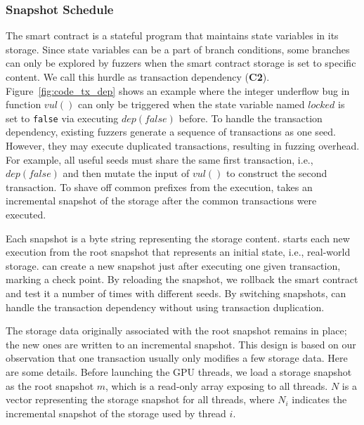 \subsubsection{Snapshot Schedule}
\label{design:snapshot}
The smart contract is a stateful program that maintains state variables in its storage. Since state variables can be a part of branch conditions, some branches can only be explored by fuzzers when the smart contract storage is set to specific content. 
We call this hurdle as transaction dependency (\textbf{C2}).
%
Figure~\ref{fig:code_tx_dep} shows an example where the integer underflow bug in function $vul()$ can only be triggered when the state variable named $locked$ is set to \texttt{false} via executing $dep(false)$ before. 
%
To handle the transaction dependency, existing fuzzers generate a sequence of transactions as one seed\cite{confuzzius_eurosp, echidna_issta, ilf_ccs}. 
%
%
However, they may execute duplicated transactions, resulting in fuzzing overhead. 
For example, all useful seeds must share the same first transaction, i.e., $dep(false)$ and then mutate the input of $vul()$ to construct the second transaction.
To shave off common prefixes from the execution, {\tool} takes an incremental snapshot of the storage after the common transactions were executed.
%
%

Each snapshot is a byte string representing the storage content. 
{\tool} starts each new execution from the root snapshot that represents an initial state, i.e., real-world storage.
{\tool} can create a new snapshot just after executing one given transaction, marking a check point. 
By reloading the snapshot, we rollback the smart contract and test it a number of times with different seeds.
%
%
By switching snapshots, {\tool} can handle the transaction dependency without using transaction duplication. 


%
The storage data originally associated with the root snapshot remains in place; the new ones are written to an incremental snapshot\cite{row2021ibm}.
%
This design is based on our observation that one transaction usually only modifies a few storage data. 
%
Here are some details.
Before launching the GPU threads, we load a storage snapshot as the root snapshot $m$, which is a read-only array exposing to all threads.
$N$ is a vector representing the storage snapshot for all threads, where $N_i$ indicates the incremental snapshot of the storage used by thread $i$.
%


